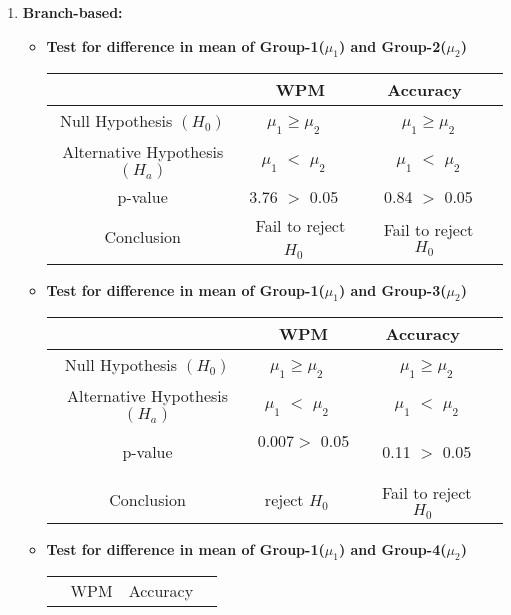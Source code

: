\documentclass[12pt,a4paper]{report}
\begin{document}
\begin{enumerate}[label=\textbf{\arabic*})]
\begin{itemize}
    \end{itemize}
    
    \item \textbf{Branch-based:}
    \begin{itemize}
        \item \textbf{Test for difference in mean of Group-1($\mu_1$) and Group-2($\mu_2$)}
         \begin{center}
    \begin{tabular}{ |c|c|c|c|}
      \hline
       & WPM & Accuracy \\
      \hline
      Null Hypothesis $(H_0)$ & $\mu_1  \geq \mu_2$ \ & \ $\mu_1  \geq \mu_2$ \\ 
      \hline
      Alternative Hypothesis $(H_a)$ & $\mu_1$ $<$ $\mu_2$ \ & \ $\mu_1$ $<$ $\mu_2$ \\
      \hline
      p-value & 3.76 $>$ 0.05 \ & \ 0.84 $>$ 0.05 \\
      \hline
      Conclusion & Fail to reject $H_0$ \ & \ Fail to reject $H_0$ \\
      \hline
    \end{tabular}
    \end{center}
    \vspace{2mm}
    \newpage
        \item \textbf{Test for difference in mean of Group-1($\mu_1$) and Group-3($\mu_2$)}
         \begin{center}
    \begin{tabular}{ |c|c|c|c|}
      \hline
       & WPM & Accuracy \\
      \hline
      Null Hypothesis $(H_0)$ & $\mu_1  \geq \mu_2$ \ & \ $\mu_1  \geq \mu_2$ \\ 
      \hline
      Alternative Hypothesis $(H_a)$ & $\mu_1$ $<$ $\mu_2$ \ & \ $\mu_1$ $<$ $\mu_2$ \\
      \hline
      p-value & 0.007$>$ 0.05 \ & \ 0.11 $>$ 0.05 \\
      \hline
      Conclusion & reject $H_0$ \ & \ Fail to reject $H_0$ \\
      \hline
    \end{tabular}
    \end{center}
    \vspace{2mm}
        \item \textbf{Test for difference in mean of Group-1($\mu_1$) and Group-4($\mu_2$)}
         \begin{center}
    \begin{tabular}{ |c|c|c|c|}
      \hline
       & WPM & Accuracy \\

\end{tabular}
\end{center}
\end{itemize}
\end{enumerate}
\end{document}
